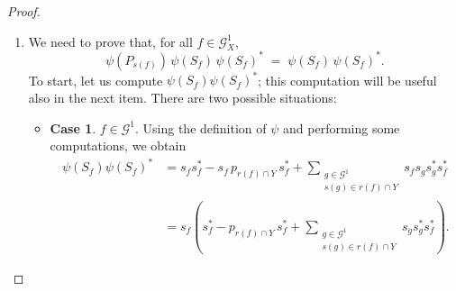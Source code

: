 \documentclass[10pt,a4paper]{amsart}
\begin{document}
\begin{proof}
\begin{enumerate}
The remaining case is when $f = e'$ for some $e \in \mathcal{G}^1$. In this situation,
$r(f) = r(e') = \emptyset \cup (r(e) \cap Y)'$, and thus
\[
\psi(P_{r(f)})
=
\psi(P_{r(e')})
=
\sum_{\substack{w \in \mathcal{G}^0 \\ w \in r(e) \cap Y}} q_w
=
p_{r(e) \cap Y}
-
\sum_{\substack{g \in \mathcal{G}^1 \\ s(g) \in r(e) \cap Y}} s_g s_g^*,
\]
where the last equality holds because the right-hand side is the left-hand side after reordering
the sum. Moreover, a computation shows that
\begin{align*}
\psi(S_f)^*\psi(S_f)
&=
\left(
s_e  p_{r(e) \cap Y}
-
\sum_{\substack{g \in \mathcal{G}^1 \\ s(g) \in r(e) \cap Y}} s_e s_g s_g^*
\right)^{\!*}
\left(
s_e  p_{r(e) \cap Y}
-
\sum_{\substack{g \in \mathcal{G}^1 \\ s(g) \in r(e) \cap Y}} s_e s_g s_g^*
\right) \\
&=
\left(
p_{r(e) \cap Y} s_e^*
-
\sum_{\substack{g \in \mathcal{G}^1 \\ s(g) \in r(e) \cap Y}} s_g s_g^* s_e^*
\right)
\left(
s_e  p_{r(e) \cap Y}
-
\sum_{\substack{g \in \mathcal{G}^1 \\ s(g) \in r(e) \cap Y}} s_e s_g s_g^*
\right) \\
&=
p_{r(e) \cap Y}
-
\sum_{\substack{g \in \mathcal{G}^1 \\ s(g) \in r(e) \cap Y}} s_g s_g^*
-
\sum_{\substack{g \in \mathcal{G}^1 \\ s(g) \in r(e) \cap Y}} s_g s_g^*
+
\sum_{\substack{g \in \mathcal{G}^1 \\ s(g) \in r(e) \cap Y}} s_g s_g^* \\
&=
p_{r(e) \cap Y}
-
\sum_{\substack{g \in \mathcal{G}^1 \\ s(g) \in r(e) \cap Y}} s_g s_g^*
=
\psi(P_{r(f)}).
\end{align*}

\item We need to prove that, for all $f \in \mathcal{G}_X^1$,
\[
\psi(P_{s(f)}) \,\psi(S_f)\, \psi(S_f)^* \;=\; \psi(S_f)\, \psi(S_f)^*.
\]
To start, let us compute $\psi(S_f) \psi(S_f)^*$; this computation will be useful also in the next
item. There are two possible situations:

\begin{itemize}
\item \textbf{Case 1}. $f \in \mathcal{G}^1$. Using the definition of $\psi$ and performing some computations, we obtain
\begin{align*}
\psi(S_f)\psi(S_f)^*
&= s_f s_f^* - s_f\, p_{r(f)\cap Y}\, s_f^*
  + \sum_{\substack{g\in\mathcal{G}^1\\ s(g)\in r(f)\cap Y}}
    s_f s_g s_g^* s_f^* \\[2pt]
&= s_f\!\left(
    s_f^* - p_{r(f)\cap Y}\, s_f^*
    + \sum_{\substack{g\in\mathcal{G}^1\\ s(g)\in r(f)\cap Y}}
      s_g s_g^* s_f^*
  \right).
\end{align*}


\end{itemize}
\end{enumerate}
\end{proof}
\end{document}
